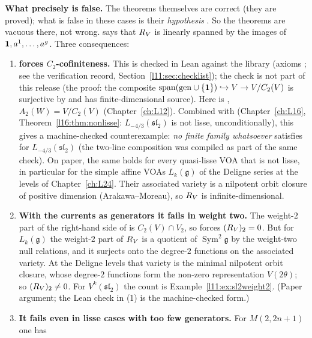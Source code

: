 \begin{warning}
\textbf{What precisely is false.} The theorems themselves are correct (they are proved); what is false in these cases is
their \emph{hypothesis} . So the theorems are vacuous there, not wrong.  says that $R_V$ is
linearly spanned by the images of $\mathbf{1},a^1,\dots,a^g$. Three consequences:
\begin{enumerate}
\item \textbf{ forces $C_2$-cofiniteness.} This is checked in Lean against the library (axioms \lean{[propext, Classical.}\allowbreak{}\allowbreak\lean{sound]}; see the verification record, Section~\ref{l11:sec:checklist}); the check is not part
  of this release
  (the proof: the composite $\operatorname{span}(\mathrm{gen}\cup\{\mathbf{1}\})\hookrightarrow V\to V/C_2(V)$ is surjective by
   and has finite-dimensional source). Here  is ,
  $A_2(W) = V/C_2(V)$ (Chapter~\ref{ch:L12}). Combined with \allowbreak{}\allowbreak{}\allowbreak{}
  (Chapter~\ref{ch:L16}, Theorem~\ref{l16:thm:nonlisse}: $L_{-4/3}(\mathfrak{sl}_2)$ is not lisse, unconditionally), this gives
  a machine-checked counterexample: \emph{no finite family whatsoever} satisfies  for
  $L_{-4/3}(\mathfrak{sl}_2)$ (the two-line composition was compiled as part of the same check). On paper, the same holds for every quasi-lisse VOA that is not lisse, in particular for the
  simple affine VOAs $L_k(\mathfrak g)$ of the Deligne series at the levels of Chapter~\ref{ch:L24}. Their associated
  variety is a nilpotent orbit closure of positive dimension (Arakawa--Moreau), so $R_V$ is infinite-dimensional.
\item \textbf{With the currents as generators it fails in weight two.} The weight-$2$ part of the right-hand side of
   is $C_2(V)\cap V_2$, so  forces $(R_V)_2 = 0$. But for $L_k(\mathfrak g)$ the weight-$2$ part of
  $R_V$ is a quotient of $\operatorname{Sym}^2\mathfrak g$ by the weight-two null relations, and it surjects onto
  the degree-$2$ functions on the associated variety. At the Deligne levels that variety is the minimal nilpotent orbit
  closure, whose degree-$2$ functions form the non-zero representation $V(2\theta)$; so $(R_V)_2\neq0$. For $V^k(\mathfrak{sl}_2)$ the count is
  Example~\ref{l11:ex:sl2weight2}. (Paper argument; the Lean check in (1) is the machine-checked form.)
\item \textbf{It fails even in lisse cases with too few generators.} For $M(2,2n+1)$ one has

\end{enumerate}
\end{warning}
